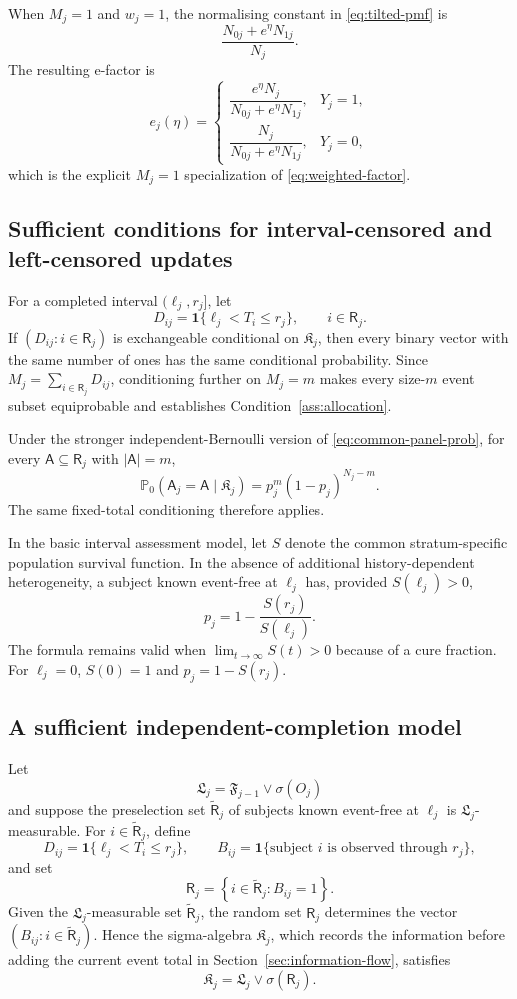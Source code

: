 \documentclass[12pt]{article}
\theoremstyle{definition}
\theoremstyle{remark}
\begin{document}
When $M_j=1$ and $w_j=1$, the normalising constant in \eqref{eq:tilted-pmf} is
\[
 \frac{N_{0j}+e^\eta N_{1j}}{N_j}.
\]
The resulting e-factor is
\[
 e_j(\eta)=
 \begin{cases}
 \dfrac{e^\eta N_j}{N_{0j}+e^\eta N_{1j}},&Y_j=1,\\[6pt]
 \dfrac{N_j}{N_{0j}+e^\eta N_{1j}},&Y_j=0,
 \end{cases}
\]
which is the explicit $M_j=1$ specialization of \eqref{eq:weighted-factor}.

\subsection{Sufficient conditions for interval-censored and left-censored updates}

For a completed interval $(\ell_j,r_j]$, let
\[
 D_{ij}=\mathbf 1\{\ell_j<T_i\leq r_j\},\qquad i\in\mathsf R_j.
\]
If $(D_{ij}:i\in\mathsf R_j)$ is exchangeable conditional on $\mathfrak K_j$, then every binary vector with the same number of ones has the same conditional probability. Since $M_j=\sum_{i\in\mathsf R_j}D_{ij}$, conditioning further on $M_j=m$ makes every size-$m$ event subset equiprobable and establishes Condition~\ref{ass:allocation}.

Under the stronger independent-Bernoulli version of \eqref{eq:common-panel-prob}, for every $\mathsf A\subseteq\mathsf R_j$ with $|\mathsf A|=m$,
\[
 \mathbb P_0\left(\mathsf A_j=\mathsf A\mid\mathfrak K_j\right)
 =p_j^m(1-p_j)^{N_j-m}.
\]
The same fixed-total conditioning therefore applies.

In the basic interval assessment model, let $S$ denote the common stratum-specific population survival function. In the absence of additional history-dependent heterogeneity, a subject known event-free at $\ell_j$ has, provided $S(\ell_j)>0$,
\[
 p_j=1-\frac{S(r_j)}{S(\ell_j)}.
\]
The formula remains valid when $\lim_{t\to\infty}S(t)>0$ because of a cure fraction. For $\ell_j=0$, $S(0)=1$ and $p_j=1-S(r_j)$.

\subsection{A sufficient independent-completion model}

Let
\[
 \mathfrak L_j=\mathfrak F_{j-1}\vee\sigma(O_j)
\]
and suppose the preselection set $\widetilde{\mathsf R}_j$ of subjects known event-free at $\ell_j$ is $\mathfrak L_j$-measurable. For $i\in\widetilde{\mathsf R}_j$, define
\[
 D_{ij}=\mathbf 1\{\ell_j<T_i\leq r_j\},
 \qquad
 B_{ij}=\mathbf 1\{\text{subject $i$ is observed through $r_j$}\},
\]
and set
\[
 \mathsf R_j=\left\{i\in\widetilde{\mathsf R}_j:B_{ij}=1\right\}.
\]
Given the $\mathfrak L_j$-measurable set $\widetilde{\mathsf R}_j$, the random set $\mathsf R_j$ determines the vector $(B_{ij}:i\in\widetilde{\mathsf R}_j)$. Hence the sigma-algebra $\mathfrak K_j$, which records the information before adding the current event total in Section~\ref{sec:information-flow}, satisfies
\[
 \mathfrak K_j=\mathfrak L_j\vee\sigma(\mathsf R_j).
\]
\end{document}
